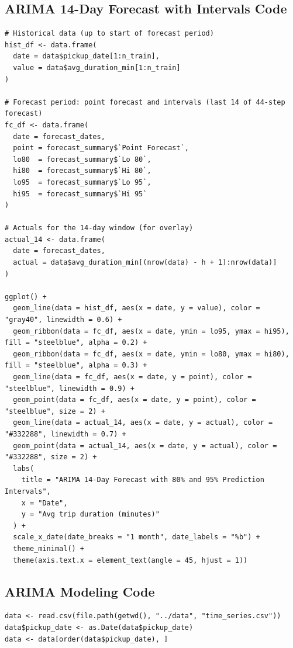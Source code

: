 \documentclass[12pt, a4paper]{article}
\begin{document}
\subsection{ARIMA 14-Day Forecast with Intervals Code}\label{appendix:arima_intervals_plot}

\begin{lstlisting}[style=pystyle, caption={ARIMA 14-day forecast with 80\% and 95\% intervals}, label=lst:arima_intervals_plot]
# Historical data (up to start of forecast period)
hist_df <- data.frame(
  date = data$pickup_date[1:n_train],
  value = data$avg_duration_min[1:n_train]
)

# Forecast period: point forecast and intervals (last 14 of 44-step forecast)
fc_df <- data.frame(
  date = forecast_dates,
  point = forecast_summary$`Point Forecast`,
  lo80  = forecast_summary$`Lo 80`,
  hi80  = forecast_summary$`Hi 80`,
  lo95  = forecast_summary$`Lo 95`,
  hi95  = forecast_summary$`Hi 95`
)

# Actuals for the 14-day window (for overlay)
actual_14 <- data.frame(
  date = forecast_dates,
  actual = data$avg_duration_min[(nrow(data) - h + 1):nrow(data)]
)

ggplot() +
  geom_line(data = hist_df, aes(x = date, y = value), color = "gray40", linewidth = 0.6) +
  geom_ribbon(data = fc_df, aes(x = date, ymin = lo95, ymax = hi95), fill = "steelblue", alpha = 0.2) +
  geom_ribbon(data = fc_df, aes(x = date, ymin = lo80, ymax = hi80), fill = "steelblue", alpha = 0.3) +
  geom_line(data = fc_df, aes(x = date, y = point), color = "steelblue", linewidth = 0.9) +
  geom_point(data = fc_df, aes(x = date, y = point), color = "steelblue", size = 2) +
  geom_line(data = actual_14, aes(x = date, y = actual), color = "#332288", linewidth = 0.7) +
  geom_point(data = actual_14, aes(x = date, y = actual), color = "#332288", size = 2) +
  labs(
    title = "ARIMA 14-Day Forecast with 80% and 95% Prediction Intervals",
    x = "Date",
    y = "Avg trip duration (minutes)"
  ) +
  scale_x_date(date_breaks = "1 month", date_labels = "%b") +
  theme_minimal() +
  theme(axis.text.x = element_text(angle = 45, hjust = 1))
\end{lstlisting}

\subsection{ARIMA Modeling Code}\label{appendix:time_series_modeling_code}

\begin{lstlisting}[style=pystyle, caption={Loading Time Series}, label=lst:load_time_series]
data <- read.csv(file.path(getwd(), "../data", "time_series.csv"))
data$pickup_date <- as.Date(data$pickup_date)
data <- data[order(data$pickup_date), ]
\end{lstlisting}
\end{document}
